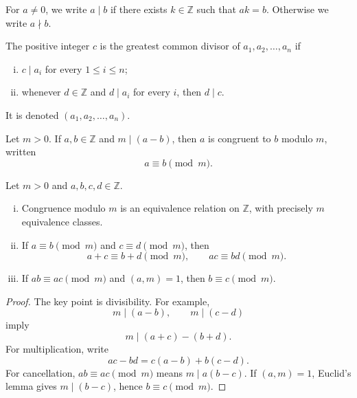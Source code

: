 \begin{definition}
For \(a\neq0\), we write \(a\mid b\) if there exists \(k\in\mathbb Z\) such that \(ak=b\).  Otherwise we write \(a\nmid b\).
\end{definition}

\begin{definition}
The positive integer \(c\) is the greatest common divisor of \(a_1,a_2,\dots,a_n\) if
\begin{enumerate}[(i)]
  \item \(c\mid a_i\) for every \(1\le i\le n\);
  \item whenever \(d\in\mathbb Z\) and \(d\mid a_i\) for every \(i\), then \(d\mid c\).
\end{enumerate}
It is denoted \((a_1,a_2,\dots,a_n)\).
\end{definition}

\begin{definition}
Let \(m>0\).  If \(a,b\in\mathbb Z\) and \(m\mid(a-b)\), then \(a\) is congruent to \(b\) modulo \(m\), written
\[
  a\equiv b\pmod m.
\]
\end{definition}

\begin{theorem}
Let \(m>0\) and \(a,b,c,d\in\mathbb Z\).
\begin{enumerate}[(i)]
  \item Congruence modulo \(m\) is an equivalence relation on \(\mathbb Z\), with precisely \(m\) equivalence classes.
  \item If \(a\equiv b\pmod m\) and \(c\equiv d\pmod m\), then
  \[
    a+c\equiv b+d\pmod m,
    \qquad
    ac\equiv bd\pmod m.
  \]
  \item If \(ab\equiv ac\pmod m\) and \((a,m)=1\), then \(b\equiv c\pmod m\).
\end{enumerate}
\end{theorem}

\begin{proof}
The key point is divisibility.  For example,
\[
  m\mid(a-b),\qquad m\mid(c-d)
\]
imply
\[
  m\mid (a+c)-(b+d).
\]
For multiplication, write
\[
  ac-bd=c(a-b)+b(c-d).
\]
For cancellation, \(ab\equiv ac\pmod m\) means \(m\mid a(b-c)\).  If \((a,m)=1\), Euclid's lemma gives \(m\mid(b-c)\), hence \(b\equiv c\pmod m\).
\end{proof}

